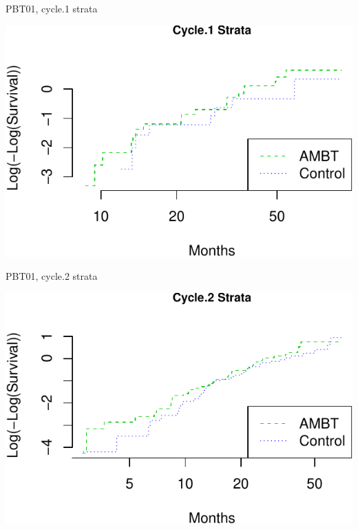 \documentclass[ignorenonframetext,]{beamer}
\begin{document}
\begin{frame}{%
\protect\hypertarget{pbt01-cycle.1-strata}{%
PBT01, cycle.1 strata}}

\scriptsize

\includegraphics{unit_05_ph_reg_spec_topics_files/figure-beamer/unnamed-chunk-2-1.pdf}

\end{frame}

\begin{frame}{%
\protect\hypertarget{pbt01-cycle.2-strata}{%
PBT01, cycle.2 strata}}

\scriptsize

\includegraphics{unit_05_ph_reg_spec_topics_files/figure-beamer/unnamed-chunk-3-1.pdf}

\end{frame}
\end{document}
